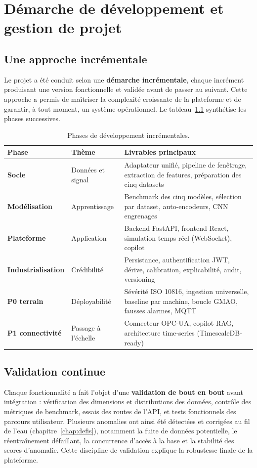 \chapter{Démarche de développement et gestion de projet}
\label{chap:methodo}

\section{Une approche incrémentale}
Le projet a été conduit selon une \textbf{démarche incrémentale}, chaque incrément
produisant une version fonctionnelle et validée avant de passer au suivant. Cette approche a
permis de maîtriser la complexité croissante de la plateforme et de garantir, à tout moment,
un système opérationnel. Le tableau~\ref{tab:phases} synthétise les phases successives.

\begin{table}[h]
\centering\small
\caption{Phases de développement incrémentales.}
\label{tab:phases}
\begin{tabular}{>{\bfseries}p{2.0cm} p{4.2cm} p{7.0cm}}
\toprule
Phase & Thème & Livrables principaux \\
\midrule
Socle & Données et signal & Adaptateur unifié, pipeline de fenêtrage, extraction de features, préparation des cinq datasets \\
Modélisation & Apprentissage & Benchmark des cinq modèles, sélection par dataset, auto-encodeurs, CNN engrenages \\
Plateforme & Application & Backend FastAPI, frontend React, simulation temps réel (WebSocket), copilot \\
Industrialisation & Crédibilité & Persistance, authentification JWT, dérive, calibration, explicabilité, audit, versioning \\
P0 terrain & Déployabilité & Sévérité ISO 10816, ingestion universelle, baseline par machine, boucle GMAO, fausses alarmes, MQTT \\
P1 connectivité & Passage à l'échelle & Connecteur OPC-UA, copilot RAG, architecture time-series (TimescaleDB-ready) \\
\bottomrule
\end{tabular}
\end{table}

\section{Validation continue}
Chaque fonctionnalité a fait l'objet d'une \textbf{validation de bout en bout} avant
intégration : vérification des dimensions et distributions des données, contrôle des
métriques de benchmark, essais des routes de l'API, et tests fonctionnels des parcours
utilisateur. Plusieurs anomalies ont ainsi été détectées et corrigées au fil de l'eau
(chapitre~\ref{chap:defis}), notamment la fuite de données potentielle, le réentraînement
défaillant, la concurrence d'accès à la base et la stabilité des scores d'anomalie. Cette
discipline de validation explique la robustesse finale de la plateforme.

